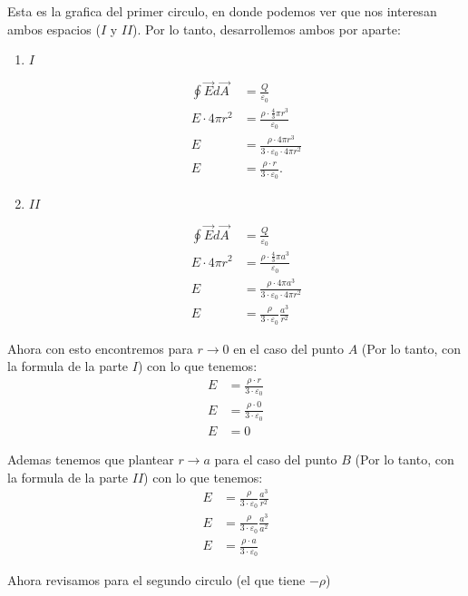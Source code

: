 \documentclass{report}
\begin{document}
Esta es la grafica del primer circulo, en donde podemos ver que nos interesan ambos espacios ($I$ y $II$). Por lo tanto, desarrollemos ambos por aparte:
\begin{enumerate}
  \item $I$

    \begin{align*}
      \oint \vec{E} d\vec{A} &= \frac{Q}{\varepsilon_0} \\
      E \cdot 4\pi r^2 &= \frac{\rho \cdot \frac{4}{3} \pi r^3}{\varepsilon_0}\\
      E &= \frac{\rho \cdot 4 \pi r^3}{3 \cdot \varepsilon_0 \cdot 4 \pi r^2}\\
      E &= \frac{\rho \cdot r}{3 \cdot \varepsilon_0}.
    \end{align*}

  \item $II$

    \begin{align*}
      \oint \vec{E} d\vec{A} &= \frac{Q}{\varepsilon_0} \\
      E \cdot 4\pi r^2 &= \frac{\rho \cdot \frac{4}{3} \pi a^3}{\varepsilon_0}\\
      E &= \frac{\rho \cdot 4 \pi a^3}{3 \cdot \varepsilon_0 \cdot 4 \pi r^2}\\
      E &= \frac{\rho}{3 \cdot \varepsilon_0} \frac{a^3}{r^2}
    \end{align*}
\end{enumerate}

Ahora con esto encontremos para $r \to 0$ en el caso del punto $A$ (Por lo tanto, con la formula de la parte $I$) con lo que tenemos:
\begin{align*}
  E &= \frac{\rho \cdot r}{3 \cdot \varepsilon_0}\\
  E &= \frac{\rho \cdot 0}{3 \cdot \varepsilon_0}\\
  E &= 0
\end{align*}

Ademas tenemos que plantear $r \to a$ para el caso del punto $B$ (Por lo tanto, con la formula de la parte $II$) con lo que tenemos:
\begin{align*}
  E &= \frac{\rho}{3 \cdot \varepsilon_0} \frac{a^3}{r^2}\\
  E &= \frac{\rho}{3 \cdot \varepsilon_0} \frac{a^3}{a^2}\\
  E &= \frac{\rho \cdot a}{3 \cdot \varepsilon_0}
\end{align*}

Ahora revisamos para el segundo circulo (el que tiene $-\rho$)
\end{document}
